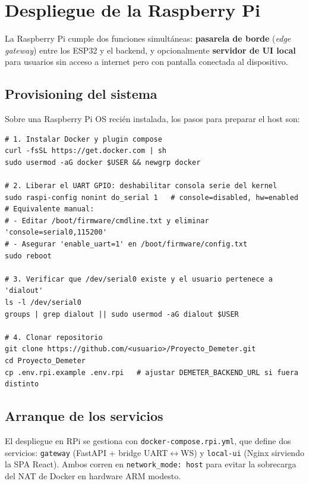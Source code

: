 \section{Despliegue de la Raspberry Pi}
\label{sec:despliegue_rpi}

La Raspberry Pi cumple dos funciones simultáneas: \textbf{pasarela de borde}
(\textit{edge gateway}) entre los ESP32 y el backend, y opcionalmente
\textbf{servidor de UI local} para usuarios sin acceso a internet pero con pantalla
conectada al dispositivo.

\subsection{Provisioning del sistema}

Sobre una Raspberry Pi OS recién instalada, los pasos para preparar el host son:

\begin{lstlisting}[style=trama, caption={Provisioning de la Raspberry Pi}]
# 1. Instalar Docker y plugin compose
curl -fsSL https://get.docker.com | sh
sudo usermod -aG docker $USER && newgrp docker

# 2. Liberar el UART GPIO: deshabilitar consola serie del kernel
sudo raspi-config nonint do_serial 1   # console=disabled, hw=enabled
# Equivalente manual:
# - Editar /boot/firmware/cmdline.txt y eliminar 'console=serial0,115200'
# - Asegurar 'enable_uart=1' en /boot/firmware/config.txt
sudo reboot

# 3. Verificar que /dev/serial0 existe y el usuario pertenece a 'dialout'
ls -l /dev/serial0
groups | grep dialout || sudo usermod -aG dialout $USER

# 4. Clonar repositorio
git clone https://github.com/<usuario>/Proyecto_Demeter.git
cd Proyecto_Demeter
cp .env.rpi.example .env.rpi   # ajustar DEMETER_BACKEND_URL si fuera distinto
\end{lstlisting}

\subsection{Arranque de los servicios}

El despliegue en RPi se gestiona con \texttt{docker-compose.rpi.yml}, que define dos
servicios: \texttt{gateway} (FastAPI + bridge UART$\leftrightarrow$WS) y
\texttt{local-ui} (Nginx sirviendo la SPA React). Ambos corren en \texttt{network\_mode:
host} para evitar la sobrecarga del NAT de Docker en hardware ARM modesto.

